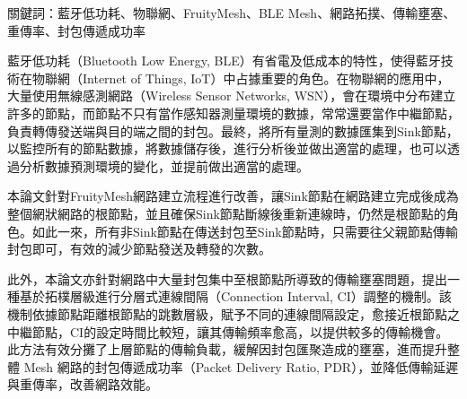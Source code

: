\begin{ZhAbstract}
    \begin{ZhAbstractItems}
        \noindent \text 關鍵詞：藍牙低功耗、物聯網、FruityMesh、BLE Mesh、網路拓撲、傳輸壅塞、重傳率、封包傳遞成功率

    \end{ZhAbstractItems}

    \begin{ZhAbstractDescription}
        藍牙低功耗（Bluetooth Low Energy, BLE）有省電及低成本的特性，使得藍牙技術在物聯網（Internet of Things, IoT）中占據重要的角色。在物聯網的應用中，大量使用無線感測網路（Wireless Sensor Networks, WSN），會在環境中分布建立許多的節點，而節點不只有當作感知器測量環境的數據，常常還要當作中繼節點，負責轉傳發送端與目的端之間的封包。最終，將所有量測的數據匯集到Sink節點，以監控所有的節點數據，將數據儲存後，進行分析後並做出適當的處理，也可以透過分析數據預測環境的變化，並提前做出適當的處理。
        
        本論文針對FruityMesh網路建立流程進行改善，讓Sink節點在網路建立完成後成為整個網狀網路的根節點，並且確保Sink節點斷線後重新連線時，仍然是根節點的角色。如此一來，所有非Sink節點在傳送封包至Sink節點時，只需要往父親節點傳輸封包即可，有效的減少節點發送及轉發的次數。
        
        此外，本論文亦針對網路中大量封包集中至根節點所導致的傳輸壅塞問題，提出一種基於拓樸層級進行分層式連線間隔（Connection Interval, CI）調整的機制。該機制依據節點距離根節點的跳數層級，賦予不同的連線間隔設定，愈接近根節點之中繼節點，CI的設定時間比較短，讓其傳輸頻率愈高，以提供較多的傳輸機會。此方法有效分攤了上層節點的傳輸負載，緩解因封包匯聚造成的壅塞，進而提升整體 Mesh 網路的封包傳遞成功率（Packet Delivery Ratio, PDR），並降低傳輸延遲與重傳率，改善網路效能。
    \end{ZhAbstractDescription}
    
\end{ZhAbstract}


